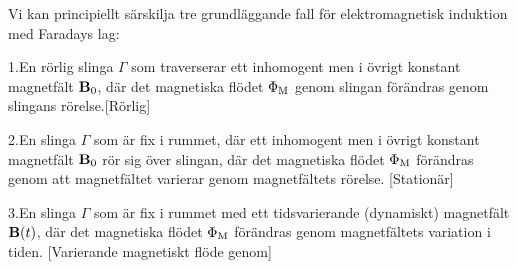 \noindent
Vi kan principiellt s{\"a}rskilja tre grundl{\"a}ggande fall f{\"o}r
elektromagnetisk induktion med Faradays lag:
\medskip
\item{1.}{En r{\"o}rlig slinga $\Gamma$ som traverserar ett inhomogent men
  i {\"o}vrigt konstant magnetf{\"a}lt ${\bf B}_0$, d{\"a}r det magnetiska
  fl{\"o}det $\Phi_{\rm M}$ genom slingan f{\"o}r{\"a}ndras genom slingans
  r{\"o}relse.[R{\"o}rlig]}
\item{2.}{En slinga $\Gamma$ som {\"a}r fix i rummet, d{\"a}r ett inhomogent
  men i {\"o}vrigt konstant magnetf{\"a}lt ${\bf B}_0$ r{\"o}r sig {\"o}ver
  slingan, d{\"a}r det magnetiska fl{\"o}det $\Phi_{\rm M}$ f{\"o}r{\"a}ndras
  genom att magnetf{\"a}ltet varierar genom magnetf{\"a}ltets r{\"o}relse.
  [Station{\"a}r]}
\item{3.}{En slinga $\Gamma$ som {\"a}r fix i rummet med ett tidsvarierande
  (dynamiskt) magnetf{\"a}lt ${\bf B}(t)$, d{\"a}r det magnetiska fl{\"o}det
  $\Phi_{\rm M}$ f{\"o}r{\"a}ndras genom magnetf{\"a}ltets variation i tiden.
  [Varierande magnetiskt fl{\"o}de genom]}
\vfill\eject


